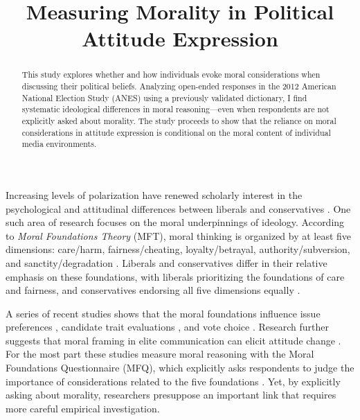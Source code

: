 \documentclass[12pt]{article}
\date{}
\title{Measuring Morality in Political Attitude Expression
}
\begin{document}
\maketitle
\doublespacing
\thispagestyle{empty}

\begin{abstract}
This study explores whether and how individuals evoke moral considerations when discussing their political beliefs. Analyzing open-ended responses in the 2012 American National Election Study (ANES) using a previously validated dictionary, I find systematic ideological differences in moral reasoning---even when respondents are not explicitly asked about morality. The study proceeds to show that the reliance on moral considerations in attitude expression is conditional on the moral content of individual media environments.

\end{abstract}
\newpage
\setcounter{page}{1}

Increasing levels of polarization have renewed scholarly interest in the psychological and attitudinal differences between liberals and conservatives \citep{jost2006end}. One such area of research focuses on the moral underpinnings of ideology. According to \textit{Moral Foundations Theory} (MFT), moral thinking is organized by at least five dimensions: care/harm, fairness/cheating, loyalty/betrayal, authority/subversion, and sanctity/degradation \citep{graham2013moral}. Liberals and conservatives differ in their relative emphasis on these foundations, with liberals prioritizing the foundations of care and fairness, and conservatives endorsing all five dimensions equally \citep{graham2009liberals}.


A series of recent studies shows that the moral foundations influence issue preferences \citep{kertzer2014moral}, candidate trait evaluations \citep{clifford2014linking}, and vote choice \citep{iyer2010beyond}. Research further suggests that moral framing in elite communication can elicit attitude change \citep[e.g.][]{clifford2015concerns,feinberg2013moral}. For the most part these studies measure moral reasoning with the Moral Foundations Questionnaire (MFQ), which explicitly asks respondents to judge the importance of considerations related to the five foundations \citep[e.g.][]{graham2011mapping}. Yet, by explicitly asking about morality, researchers presuppose an important link that requires more careful empirical investigation.
\end{document}
